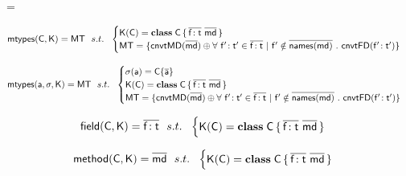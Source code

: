 \documentclass[a4paper,UKenglish,final]{tex/lipics-v2016}
\begin{document}
\hrulefill


\mtype\m\C\K = \convert{\methz\m\C\K} 

\hrulefill


\begin{equation*}
\classoff\C\K = \Mxt{MT} ~~s.t.~~ \begin{cases}

 \K(\C) = \Class \C {\b{\Ftype\f\t}}{\b\md} \\
 \Mxt{MT} = \{\convert{\b\md} \oplus \forall ~\Ftype\fp\tp \in \b{\Ftype\f\t} ~|~ \fp \notin \b{\names{\md}} ~.~ \convertFD{\Ftype\fp\tp}\}

\end{cases}
\end{equation*}

\hrulefill



\begin{equation*}
\classoffs\a\s\K = \Mxt{MT} ~~s.t.~~ \begin{cases}

 \s(\a) = \obj\C{\b\a} \\
 \K(\C) = \Class \C {\b{\Ftype\f\t}}{\b\md} \\
 \Mxt{MT} = \{\convert{\b\md} \oplus \forall ~\Ftype\fp\tp \in \b{\Ftype\f\t} ~|~ \fp \notin \b{\names{\md}} ~.~ \convertFD{\Ftype\fp\tp}\}

\end{cases}
\end{equation*}

\hrulefill


\begin{equation*}
\field\C\K = \b{\Ftype\f\t} ~~s.t.~~ \begin{cases}

 \K(\C) = \Class \C {\b{\Ftype\f\t}}{\b\md}
\end{cases}
\end{equation*}

\hrulefill


\begin{equation*}
\method\C\K = \b\md ~~s.t.~~ \begin{cases}

 \K(\C) = \Class \C {\b{\Ftype\f\t}}{\b\md}\\
\end{cases}
\end{equation*}
\end{document}
